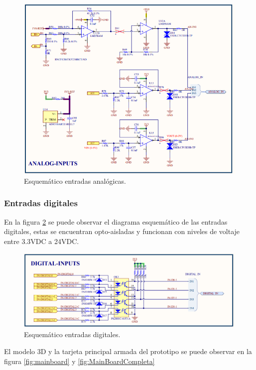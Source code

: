 \begin{figure}[H]
	\centering
	\includegraphics[scale=.65]{./Figures/inputanalog.PNG}
	\caption{Esquemático entradas analógicas.}
	\label{fig:inputanalog}
\end{figure}

\subsubsection{Entradas digitales}

En la figura \ref{fig:digitalinputs} se puede observar el diagrama esquemático de las entradas digitales, estas se encuentran opto-aisladas y funcionan con niveles de voltaje entre 3.3VDC a 24VDC.

\begin{figure}[H]
	\centering
	\includegraphics[scale=.45]{./Figures/digitalinputs.PNG}
	\caption{Esquemático entradas digitales.}
	\label{fig:digitalinputs}
\end{figure}

El modelo 3D y la tarjeta principal armada del prototipo se puede observar en la figura \ref{fig:mainboard} y \ref{fig:MainBoardCompleta}

